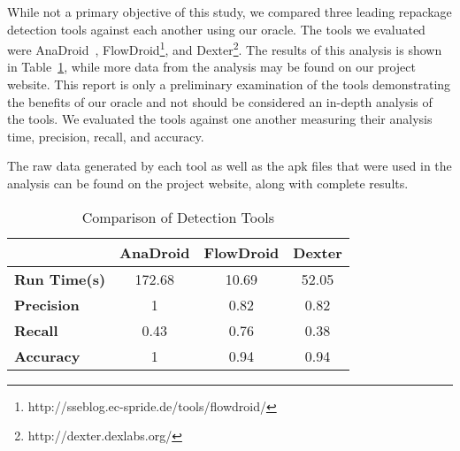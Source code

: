 \documentclass{sig-alternate}
\begin{document}
While not a primary objective of this study, we compared three leading repackage detection tools against each another using our oracle. The tools we evaluated were AnaDroid~\cite{journals/corr/LiangMH13}, FlowDroid\footnote{http://sseblog.ec-spride.de/tools/flowdroid/}, and Dexter\footnote{http://dexter.dexlabs.org/}. The results of this analysis is shown in Table~\ref{Table:toolcomparision}, while more data from the analysis may be found on our project website. This report is only a preliminary examination of the tools demonstrating the benefits of our oracle and not should be considered an in-depth analysis of the tools. We evaluated the tools against one another measuring their analysis time, precision, recall, and accuracy.

The raw data generated by each tool as well as the apk files that were used in the analysis can be found on the project website, along with complete results.


 
 
	
	
\begin{table}[ht]
\begin{center}
\caption{Comparison of Detection Tools}
\label{Table:toolcomparision}
  \begin{tabular}{ l | c | c | c } 

 &   \bfseries AnaDroid  & \bfseries FlowDroid  &   \bfseries Dexter \\ \hline \hline


	\bfseries    Run Time(s) &	172.68  &	10.69 & 52.05 \\ \hline
	\bfseries    Precision  &	1	& 0.82 & 	0.82 \\ \hline
	\bfseries     Recall  &	0.43 &	0.76 &	0.38 \\ \hline
	\bfseries     Accuracy  &	1 &	0.94 &	0.94 \\ 

  \end{tabular}
\end{center}
\end{table}
\end{document}

